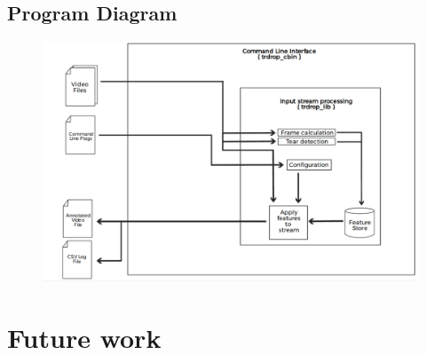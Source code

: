 \documentclass[titlepage]{article}
\begin{document}
\subsection{Program Diagram}

\begin{figure}[H]
\hspace{-30mm}
\includegraphics[width=500pt,left]{../../images/trdrop_diagram.eps}
\end{figure}

\section{Future work}
\end{document}
